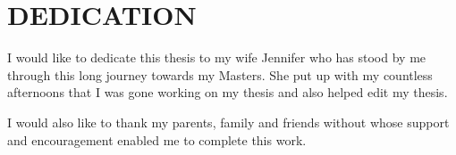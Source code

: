 \chapter*{DEDICATION}

I would like to dedicate this thesis to my wife Jennifer who has stood by me through this long journey towards my Masters.  She put up with my countless afternoons that I was gone working on my thesis and also helped edit my thesis.  

I would also like to thank my parents, family and friends without whose support and encouragement enabled me to complete this work.


